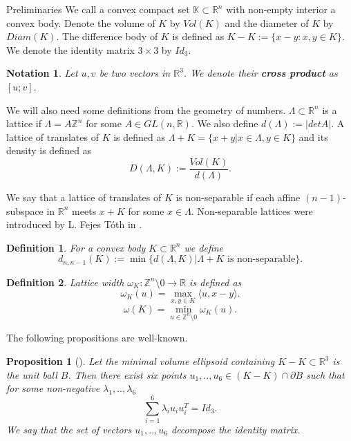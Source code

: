 \documentclass[12pt]{article}
\newcommand\R{\mathbb R}
\newcommand\Z{\mathbb Z}
\newtheorem{proposition}{Proposition}[section]
\newtheorem{definition}{Definition}[section]
\newtheorem{notation}{Notation}[section]
\begin{document}
\begin{section}{Preliminaries}
     We call a convex compact set $\mathbb{K}\subset\mathbb{R}^{n}$ with non-empty interior a convex body. Denote the volume of $K$ by $Vol(K)$ and the diameter of $K$ by $Diam(K).$
    The difference body of $K$ is defined as $K-K:=\{x-y : x,y\in K\}$. We denote the identity matrix $3\times 3$ by $Id_{3}$.
    
    \begin{notation}
       Let $u,v$ be two vectors  in $ \mathbb{R}^{3}$. We denote their \textbf{cross product} as $[u;v].$ 
     \end{notation}
     
    We will also need some definitions from the geometry of numbers. $\Lambda\subset \R^{n}$ is a lattice if $\Lambda = A\mathbb{Z}^n$ for some $A\in GL(n,\mathbb{R})$. We also define $d(\Lambda) := |det A|.$ A lattice of translates of $K$ is defined as $\Lambda + K = \{x+y| x\in \Lambda,y\in K\}$ and its density is defined as $$D(\Lambda, K) := \frac{Vol(K)}{d(\Lambda)}.$$     


    We say that a         lattice of translates of $K$ is non-separable if each affine $(n-1)$-subspace in $\R^{n}$ meets $x+K$ for some $x\in\Lambda$. Non-separable lattices were introduced by  L. Fejes T\'oth in \cite{makai1974}. 
    \begin{definition} For a convex body $K\subset \mathbb{R}^{n}$ we define 
        $$d_{n,n-1}(K) := \min\{d(\Lambda,K)| \Lambda+K \text{ is non-separable} \}.$$ 
    \end{definition}

    \begin{definition}
        Lattice width $\omega_{K}:\Z^{n}\setminus{0}\to \R$ is defined as 
        $$
        \omega_{K}(u)=\max_{x,y\in K}\langle u, x-y\rangle.
        $$
        $$
            \omega(K) = \min_{u\in \mathbb{Z}^{n}\setminus 0} \omega_{K}(u).
        $$
    \end{definition}

    The following propositions are well-known.
    \begin{proposition}[\cite{ball}]
        Let the minimal volume ellipsoid containing $K-K\subset\mathbb{R}^{3}$ is the unit ball $B$. Then there exist six points $u_{1},..,u_{6}\in (K-K)\cap \partial B$ such that for some non-negative $\lambda_{1},..,\lambda_{6}$ 
        $$
            \sum_{i=1}^{6}\lambda_{i}u_{i}u_{i}^{T} = Id_{3}.
        $$
    We say that the set of vectors $u_{1},..,u_{6}$ decompose the identity matrix.  
    \end{proposition}


\end{section}
\end{document}
